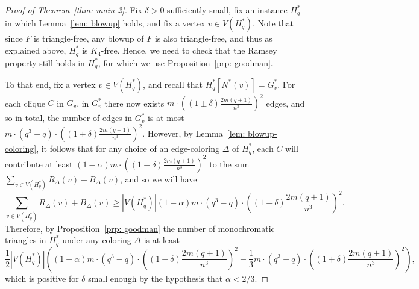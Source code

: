 \documentclass[10pt,a4paper]{amsart}
\def\a{\alpha}
\def\d{\delta}
\begin{document}
\begin{proof}[Proof of Theorem~\ref{thm: main-2}]
Fix $\d > 0$ sufficiently small, fix an instance $H_q^*$ in which Lemma~\ref{lem: blowup} holds, and fix a vertex $v \in V(H_q^*)$.
Note that since $F$ is triangle-free, any blowup of $F$ is also triangle-free, and thus as explained above, $H_q^*$ is $K_4$-free.
Hence, we need to check that the Ramsey property still holds in $H_q^*$, for which we use Proposition~\ref{prp: goodman}.

To that end, fix 
a vertex $v \in V(H_q^*)$, and recall that $H_q^*[N^*(v)] = G_v^*$.
For each clique $C$ in $G_v$, in $G_v^*$ there now exists $m \cdot \left((1\pm\d)\frac{2m(q+1)}{n^3}\right)^2$ edges, and so in total, the number of edges in $G_v^*$ is at most $m \cdot (q^3-q) \cdot \left((1+\d)\frac{2m(q+1)}{n^3}\right)^2$.
However, by Lemma~\ref{lem: blowup-coloring}, it follows that for any choice of an edge-coloring $\Delta$ of $H_q^*$, each $C$ will contribute at least 
$(1 - \a) m \cdot \left((1-\d)\frac{2m(q+1)}{n^3}\right)^2$
to the sum $\sum_{v \in V(H_q^*)} R_\Delta(v) + B_\Delta(v)$, 
and so
we will have
\begin{equation*}
    \sum_{v \in V(H_q^*)} R_\Delta(v) + B_\Delta(v) \geq |V(H_q^*)|(1-\a) m \cdot (q^3-q) \cdot \left((1-\d)\frac{2m(q+1)}{n^3}\right)^2.
\end{equation*}
Therefore, by Proposition~\ref{prp: goodman} the number of monochromatic triangles in $H_q^*$ under any coloring $\Delta$ is at least
\begin{equation*}
    \frac{1}{2}|V(H_q^*)| \left( \left(1-\a\right) m \cdot (q^3-q) \cdot \left((1-\d)\frac{2m(q+1)}{n^3}\right)^2 - \frac{1}{3} m \cdot (q^3-q) \cdot \left((1+\d)\frac{2m(q+1)}{n^3}\right)^2 \right),
\end{equation*}
which is positive for $\d$ small enough by the hypothesis that $\a < 2/3$.
\end{proof}
\end{document}
